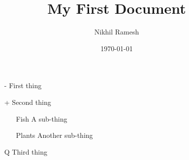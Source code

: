 \documentclass[a4paper,12pt]{article}
\begin{document}
\title{My First Document}
\author{Nikhil Ramesh}
\date{\today}
\maketitle


\begin{itemize}

\item[-] First thing

\item[+] Second thing

\begin{itemize}

\item[Fish] A sub-thing

\item[Plants] Another sub-thing

\end{itemize}

\item[Q] Third thing

\end{itemize}
\end{document}
